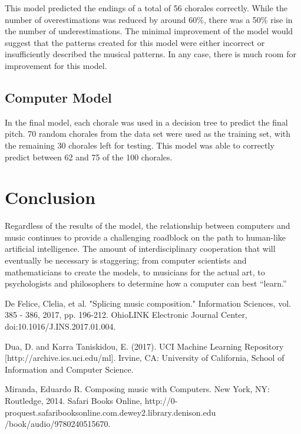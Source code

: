 \documentclass[12pt]{article}
\begin{document}
This model predicted the endings of a total of 56 chorales correctly. While the number of overestimations was reduced by around 60\%, there was a 50\% rise in the number of underestimations. The minimal improvement of the model would suggest that the patterns created for this model were either incorrect or insufficiently described the musical patterns. In any case, there is much room for improvement for this model.

\subsection{Computer Model}
In the final model, each chorale was used in a decision tree to predict the final pitch. 70 random chorales from the data set were used as the training set, with the remaining 30 chorales left for testing. This model was able to correctly predict between 62 and 75 of the 100 chorales. 

\section{Conclusion}
Regardless of the results of the model, the relationship between computers and music continues to provide a challenging roadblock on the path to human-like artificial intelligence. The amount of interdisciplinary cooperation that will eventually be necessary is staggering; from computer scientists and mathematicians to create the models, to musicians for the actual art, to psychologists and philosophers to determine how a computer can best ``learn.'' 

\begin{thebibliography}{10}
  De Felice, Clelia, et al. "Splicing music composition." Information Sciences, vol. 385 - 386, 2017, pp. 196-212. OhioLINK Electronic Journal Center, doi:10.1016/J.INS.2017.01.004.

  Dua, D. and Karra Taniskidou, E. (2017). UCI Machine Learning Repository [http://archive.ics.uci.edu/ml]. Irvine, CA: University of California, School of Information and Computer Science.

  Miranda, Eduardo R. Composing music with Computers. New York, NY: Routledge, 2014. Safari Books Online, http://0-proquest.safaribooksonline.com.dewey2.library.denison.edu\\/book/audio/9780240515670.
\end{thebibliography}
\end{document}
